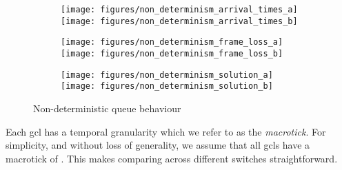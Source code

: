 \begin{figure}[t]
	\centering
	\begin{subfigure}{\linewidth}
      \centering
	   \texttt{[image: figures/non\_determinism\_arrival\_times\_a]}
      \texttt{[image: figures/non\_determinism\_arrival\_times\_b]}
      \label{fig:non_determinism_arrival_times}
	\end{subfigure}
	\begin{subfigure}{\linewidth}
      \centering
	   \texttt{[image: figures/non\_determinism\_frame\_loss\_a]}
	   \texttt{[image: figures/non\_determinism\_frame\_loss\_b]}
      \label{fig:non_determinism_frame_loss}
	\end{subfigure}
	\begin{subfigure}{\linewidth}
      \centering
	   \texttt{[image: figures/non\_determinism\_solution\_a]}
	   \texttt{[image: figures/non\_determinism\_solution\_b]}
      \label{fig:non_determinism_solution}
	\end{subfigure}
   \caption{Non-deterministic queue behaviour}
	\label{fig:non_determinism}
\end{figure}



Each \gls{gcl} has a temporal granularity which we refer to as the \emph{macrotick}.
For simplicity, and without loss of generality, we assume that all \gls{gcl}s have a macrotick of .
This makes comparing  across different switches straightforward.

